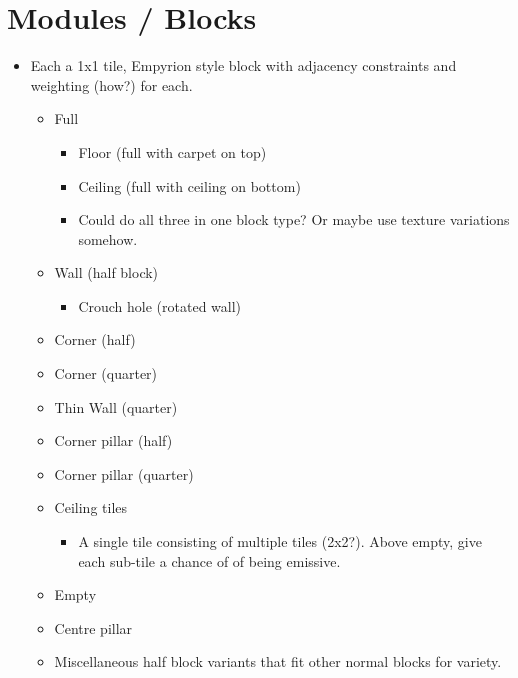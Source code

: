 \section*{Modules / Blocks}
\begin{itemize}
    \item Each a 1x1 tile, Empyrion style block with adjacency constraints and weighting (how?) for each.
          \begin{itemize}
              \item Full
                    \begin{itemize}
                        \item Floor (full with carpet on top)
                        \item Ceiling (full with ceiling on bottom)
                        \item Could do all three in one block type? Or maybe use texture variations somehow.
                    \end{itemize}
              \item Wall (half block)
                    \begin{itemize}
                        \item Crouch hole (rotated wall)
                    \end{itemize}
              \item Corner (half)
              \item Corner (quarter)
              \item Thin Wall (quarter)
              \item Corner pillar (half)
              \item Corner pillar (quarter)
              \item Ceiling tiles
                    \begin{itemize}
                        \item A single tile consisting of multiple tiles (2x2?). Above empty, give each sub-tile a chance of of being emissive.
                    \end{itemize}
              \item Empty
              \item Centre pillar
              \item Miscellaneous half block variants that fit other normal blocks for variety.
          \end{itemize}
\end{itemize}

